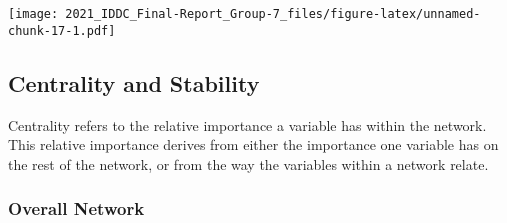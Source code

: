 \documentclass[
]{article}
\newenvironment{Shaded}{\begin{snugshade}}{\end{snugshade}}
\newcommand{\CommentTok}[1]{\textcolor[rgb]{0.56,0.35,0.01}{\textit{#1}}}
\newcommand{\DataTypeTok}[1]{\textcolor[rgb]{0.13,0.29,0.53}{#1}}
\newcommand{\DecValTok}[1]{\textcolor[rgb]{0.00,0.00,0.81}{#1}}
\newcommand{\KeywordTok}[1]{\textcolor[rgb]{0.13,0.29,0.53}{\textbf{#1}}}
\newcommand{\NormalTok}[1]{#1}
\newcommand{\OperatorTok}[1]{\textcolor[rgb]{0.81,0.36,0.00}{\textbf{#1}}}
\newcommand{\StringTok}[1]{\textcolor[rgb]{0.31,0.60,0.02}{#1}}
\begin{document}
\begin{Shaded}
\end{Shaded}

\texttt{[image: 2021\_IDDC\_Final-Report\_Group-7\_files/figure-latex/unnamed-chunk-17-1.pdf]}

\hypertarget{centrality-and-stability}{%
\subsection{Centrality and Stability}\label{centrality-and-stability}}

Centrality refers to the relative importance a variable has within the
network. This relative importance derives from either the importance one
variable has on the rest of the network, or from the way the variables
within a network relate.

\hypertarget{overall-network-1}{%
\subsubsection{Overall Network}\label{overall-network-1}}
\end{document}
